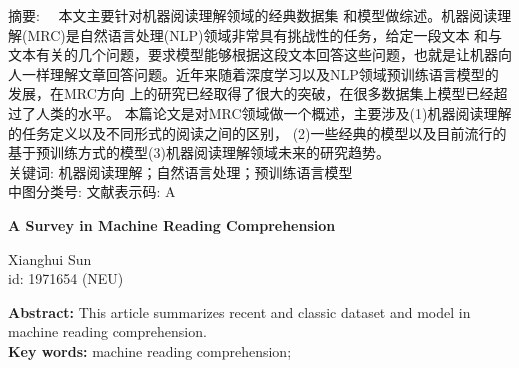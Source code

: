 \noindent \heiti 摘要: \songti　本文主要针对机器阅读理解领域的经典数据集
和模型做综述。机器阅读理解(MRC)是自然语言处理(NLP)领域非常具有挑战性的任务，给定一段文本
和与文本有关的几个问题，要求模型能够根据这段文本回答这些问题，也就是让机器向
人一样理解文章回答问题。近年来随着深度学习以及NLP领域预训练语言模型的发展，在MRC方向
上的研究已经取得了很大的突破，在很多数据集上模型已经超过了人类的水平。
本篇论文是对MRC领域做一个概述，主要涉及(1)机器阅读理解的任务定义以及不同形式的阅读之间的区别，
(2)一些经典的模型以及目前流行的基于预训练方式的模型(3)机器阅读理解领域未来的研究趋势。\\
\heiti 关键词: \songti 机器阅读理解；自然语言处理；预训练语言模型　\\
\heiti 中图分类号:  \hspace{1cm} \heiti 文献表示码: \songti A \\

\begin{center}
    \textbf{ A Survey in Machine Reading Comprehension \\}

     Xianghui Sun \\
 id: 1971654 (NEU) 

\end{center}
\textbf{Abstract:} This article summarizes recent and classic dataset and model
in machine reading comprehension.\\
\textbf{Key words:} machine reading comprehension;